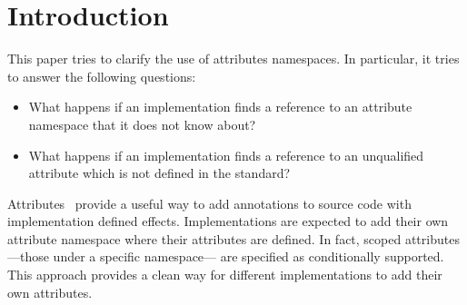 \section{Introduction}

This paper tries to clarify the use of attributes namespaces. In particular,
it tries to answer the following questions:

\begin{itemize}
\item What happens if an implementation finds a reference to an attribute namespace
      that it does not know about?

\item What happens if an implementation finds a reference to an unqualified
attribute which is not defined in the standard?

\end{itemize}

Attributes~\cite{n2761} provide a useful way to add annotations to source code
with implementation defined effects. Implementations are expected to add their
own attribute namespace where their attributes are defined. In fact, scoped
attributes ---those under a specific namespace--- are specified as
conditionally supported. This approach provides a clean way for different
implementations to add their own attributes.
